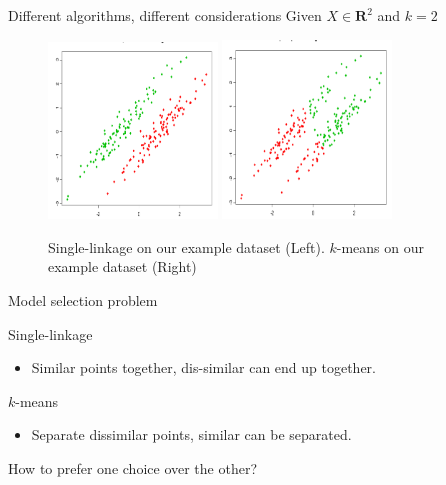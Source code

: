 \documentclass{beamer}
\newcommand{\mb}{\mathbf}
\begin{document}
\begin{frame}{Different algorithms, different considerations}
	Given $X \in \mb R^2$ and $k = 2$
	\begin{center}
	\begin{figure}
	\includegraphics[trim={0 0 0 20},clip,width=0.4\textwidth]{figures/slX.png}
	\includegraphics[trim={0 0 0 20},clip,width=0.4\textwidth]{figures/kmeansX.png}
	\caption{Single-linkage on our example dataset (Left). $k$-means on our example dataset (Right)}
	\end{figure}
	\end{center}
\end{frame}

\begin{frame}{Model selection problem}
	
	Single-linkage\\
	\begin{itemize}
		\item Similar points together, dis-similar can end up together.
	\end{itemize}
	
	\vspace{10pt}$k$-means\\
	\begin{itemize}
		\item Separate dissimilar points, similar can be separated. 
	\end{itemize}
	
	 \vspace{20pt}\alert{How to prefer one choice over the other}?
\end{frame}
\end{document}
